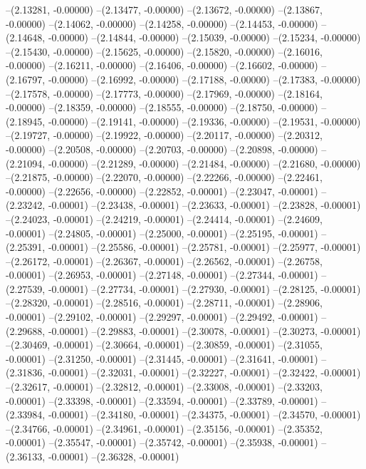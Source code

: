--(2.13281, -0.00000)
--(2.13477, -0.00000)
--(2.13672, -0.00000)
--(2.13867, -0.00000)
--(2.14062, -0.00000)
--(2.14258, -0.00000)
--(2.14453, -0.00000)
--(2.14648, -0.00000)
--(2.14844, -0.00000)
--(2.15039, -0.00000)
--(2.15234, -0.00000)
--(2.15430, -0.00000)
--(2.15625, -0.00000)
--(2.15820, -0.00000)
--(2.16016, -0.00000)
--(2.16211, -0.00000)
--(2.16406, -0.00000)
--(2.16602, -0.00000)
--(2.16797, -0.00000)
--(2.16992, -0.00000)
--(2.17188, -0.00000)
--(2.17383, -0.00000)
--(2.17578, -0.00000)
--(2.17773, -0.00000)
--(2.17969, -0.00000)
--(2.18164, -0.00000)
--(2.18359, -0.00000)
--(2.18555, -0.00000)
--(2.18750, -0.00000)
--(2.18945, -0.00000)
--(2.19141, -0.00000)
--(2.19336, -0.00000)
--(2.19531, -0.00000)
--(2.19727, -0.00000)
--(2.19922, -0.00000)
--(2.20117, -0.00000)
--(2.20312, -0.00000)
--(2.20508, -0.00000)
--(2.20703, -0.00000)
--(2.20898, -0.00000)
--(2.21094, -0.00000)
--(2.21289, -0.00000)
--(2.21484, -0.00000)
--(2.21680, -0.00000)
--(2.21875, -0.00000)
--(2.22070, -0.00000)
--(2.22266, -0.00000)
--(2.22461, -0.00000)
--(2.22656, -0.00000)
--(2.22852, -0.00001)
--(2.23047, -0.00001)
--(2.23242, -0.00001)
--(2.23438, -0.00001)
--(2.23633, -0.00001)
--(2.23828, -0.00001)
--(2.24023, -0.00001)
--(2.24219, -0.00001)
--(2.24414, -0.00001)
--(2.24609, -0.00001)
--(2.24805, -0.00001)
--(2.25000, -0.00001)
--(2.25195, -0.00001)
--(2.25391, -0.00001)
--(2.25586, -0.00001)
--(2.25781, -0.00001)
--(2.25977, -0.00001)
--(2.26172, -0.00001)
--(2.26367, -0.00001)
--(2.26562, -0.00001)
--(2.26758, -0.00001)
--(2.26953, -0.00001)
--(2.27148, -0.00001)
--(2.27344, -0.00001)
--(2.27539, -0.00001)
--(2.27734, -0.00001)
--(2.27930, -0.00001)
--(2.28125, -0.00001)
--(2.28320, -0.00001)
--(2.28516, -0.00001)
--(2.28711, -0.00001)
--(2.28906, -0.00001)
--(2.29102, -0.00001)
--(2.29297, -0.00001)
--(2.29492, -0.00001)
--(2.29688, -0.00001)
--(2.29883, -0.00001)
--(2.30078, -0.00001)
--(2.30273, -0.00001)
--(2.30469, -0.00001)
--(2.30664, -0.00001)
--(2.30859, -0.00001)
--(2.31055, -0.00001)
--(2.31250, -0.00001)
--(2.31445, -0.00001)
--(2.31641, -0.00001)
--(2.31836, -0.00001)
--(2.32031, -0.00001)
--(2.32227, -0.00001)
--(2.32422, -0.00001)
--(2.32617, -0.00001)
--(2.32812, -0.00001)
--(2.33008, -0.00001)
--(2.33203, -0.00001)
--(2.33398, -0.00001)
--(2.33594, -0.00001)
--(2.33789, -0.00001)
--(2.33984, -0.00001)
--(2.34180, -0.00001)
--(2.34375, -0.00001)
--(2.34570, -0.00001)
--(2.34766, -0.00001)
--(2.34961, -0.00001)
--(2.35156, -0.00001)
--(2.35352, -0.00001)
--(2.35547, -0.00001)
--(2.35742, -0.00001)
--(2.35938, -0.00001)
--(2.36133, -0.00001)
--(2.36328, -0.00001)
